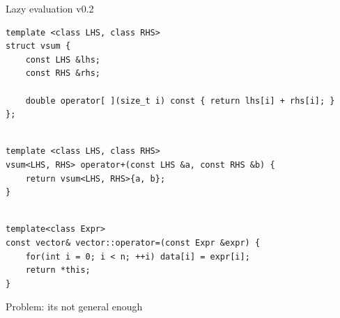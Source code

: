 \documentclass[@BEAMER_OPTIONS@]{beamer}
\begin{document}
\note{ }

\begin{frame}[fragile,shrink=2]{Lazy evaluation v0.2}
    \begin{exampleblock}{}
        \begin{lstlisting}
template <class LHS, class RHS>
struct vsum {
    const LHS &lhs;
    const RHS &rhs;

    double operator[ ](size_t i) const { return lhs[i] + rhs[i]; }
};
        \end{lstlisting}
        \pause
        \begin{lstlisting}[firstnumber=last]

template <class LHS, class RHS>
vsum<LHS, RHS> operator+(const LHS &a, const RHS &b) {
    return vsum<LHS, RHS>{a, b};
}
        \end{lstlisting}
        \pause
        \begin{lstlisting}[firstnumber=last]

template<class Expr>
const vector& vector::operator=(const Expr &expr) {
    for(int i = 0; i < n; ++i) data[i] = expr[i];
    return *this;
}
        \end{lstlisting}
    \end{exampleblock}
\end{frame}

\note{ }

\begin{frame}{Problem: its not general enough}
    \begin{figure}
    \end{figure}
\end{frame}
\end{document}
